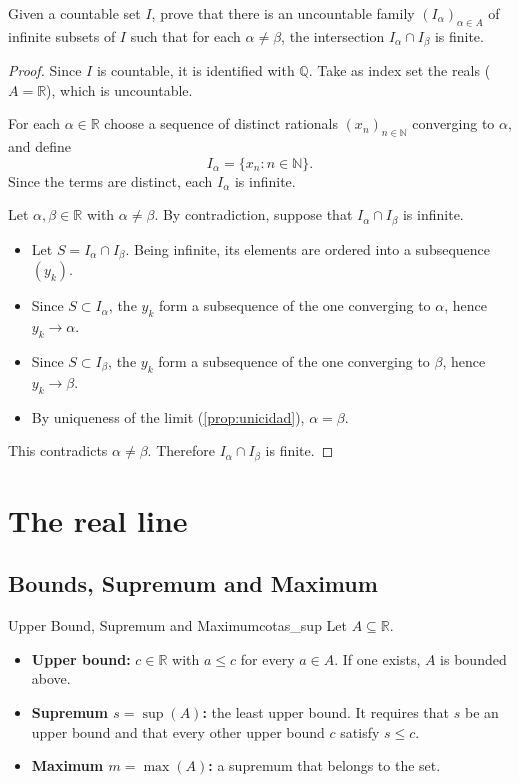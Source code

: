 \documentclass[11pt, a4paper]{article}
\begin{document}
Given a countable set $I$, prove that there is an uncountable family
$(I_{\alpha})_{\alpha \in A}$ of infinite subsets of $I$ such that for each
$\alpha \neq \beta$, the intersection $I_{\alpha} \cap I_{\beta}$ is finite.

\begin{proof}
Since $I$ is countable, it is identified with $\mathbb{Q}$. Take as index set the
reals ($A = \mathbb{R}$), which is uncountable.

For each $\alpha \in \mathbb{R}$ choose a sequence of distinct rationals
$(x_n)_{n \in \mathbb{N}}$ converging to $\alpha$, and define
$$ I_{\alpha} = \{ x_n : n \in \mathbb{N} \}. $$
Since the terms are distinct, each $I_{\alpha}$ is infinite.

Let $\alpha, \beta \in \mathbb{R}$ with $\alpha \neq \beta$. By contradiction, suppose that
$I_{\alpha} \cap I_{\beta}$ is infinite.
\begin{itemize}
    \item Let $S = I_{\alpha} \cap I_{\beta}$. Being infinite, its elements are ordered into a
    subsequence $(y_k)$.
    \item Since $S \subset I_{\alpha}$, the $y_k$ form a subsequence of the one converging to
    $\alpha$, hence $y_k \to \alpha$.
    \item Since $S \subset I_{\beta}$, the $y_k$ form a subsequence of the one converging to $\beta$,
    hence $y_k \to \beta$.
    \item By uniqueness of the limit (\ref{prop:unicidad}), $\alpha = \beta$.
\end{itemize}
This contradicts $\alpha \neq \beta$. Therefore $I_{\alpha} \cap I_{\beta}$ is finite.
\end{proof}

\newpage

\section{The real line}

\subsection{Bounds, Supremum and Maximum}

\begin{definicion}{Upper Bound, Supremum and Maximum}{cotas_sup}
Let $A \subseteq \mathbb{R}$.
\begin{itemize}
    \item \textbf{Upper bound:} $c \in \mathbb{R}$ with $a \le c$ for every $a \in A$. If one exists,
    $A$ is bounded above.
    \item \textbf{Supremum $s = \sup(A)$:} the least upper bound. It requires that $s$ be an upper bound and
    that every other upper bound $c$ satisfy $s \le c$.
    \item \textbf{Maximum $m = \max(A)$:} a supremum that belongs to the set.
\end{itemize}
\end{definicion}
\end{document}
